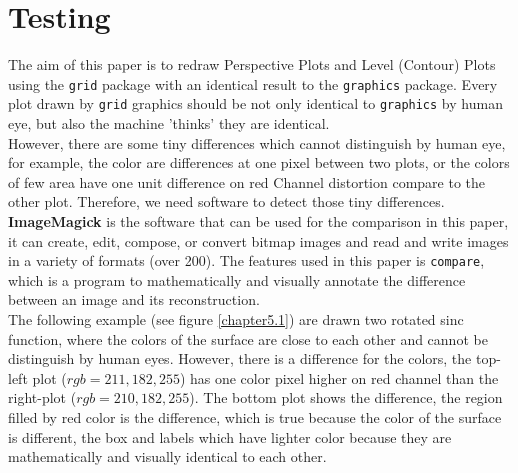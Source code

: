 \documentclass[paper=a4, fontsize=11pt]{report}
\begin{document}
\chapter{Testing}
The aim of this paper is to redraw Perspective Plots and Level (Contour) Plots using the \texttt{grid} package with an identical result to the \texttt{graphics} package. Every plot drawn by \texttt{grid} graphics should be not only identical to \texttt{graphics} by human eye, but also the machine 'thinks' they are identical.\\

However, there are some tiny differences which cannot distinguish by human eye, for example, the color are differences at one pixel between two plots, or the colors of few area have one unit difference on red Channel distortion compare to the other plot. Therefore, we need software to detect those tiny differences.\\

\textbf{ImageMagick} is the software that can be used for the comparison in this paper, it can create, edit, compose, or convert bitmap images and read and write images in a variety of formats (over 200). The features used in this paper is \texttt{compare}, which is a program to mathematically and visually annotate the difference between an image and its reconstruction.\\

The following example (see figure \ref{chapter5.1}) are drawn two rotated sinc function, where the colors of the surface are close to each other and cannot be distinguish by human eyes. However, there is a difference for the colors, the top-left plot ($rgb = 211, 182, 255$) has one color pixel higher on red channel than the right-plot ($rgb = 210, 182, 255$). The bottom plot shows the difference, the region filled by red color is the difference, which is true because the color of the surface is different, the box and labels which have lighter color because they are mathematically and visually identical to each other. \\
\end{document}
